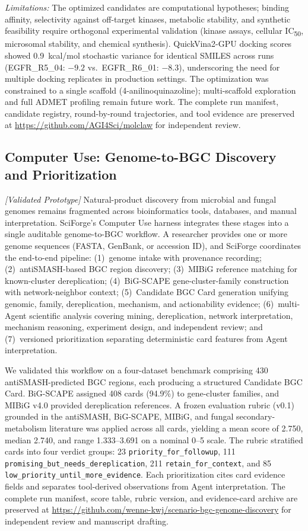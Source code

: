 \documentclass[sn-basic,Numbered,pdflatex]{sn-jnl}
\begin{document}
\textit{Limitations:} The optimized candidates are computational hypotheses; binding affinity, selectivity against off-target kinases, metabolic stability, and synthetic feasibility require orthogonal experimental validation (kinase assays, cellular IC\textsubscript{50}, microsomal stability, and chemical synthesis). QuickVina2-GPU docking scores showed 0.9~kcal/mol stochastic variance for identical SMILES across runs (EGFR\_R5\_04: $-9.2$ vs.\ EGFR\_R6\_01: $-8.3$), underscoring the need for multiple docking replicates in production settings. The optimization was constrained to a single scaffold (4-anilinoquinazoline); multi-scaffold exploration and full ADMET profiling remain future work. The complete run manifest, candidate registry, round-by-round trajectories, and tool evidence are preserved at \url{https://github.com/AGI4Sci/molclaw} for independent review.

\FloatBarrier
\subsection{Computer Use: Genome-to-BGC Discovery and Prioritization}

\textit{[Validated Prototype]} Natural-product discovery from microbial and fungal genomes remains fragmented across bioinformatics tools, databases, and manual interpretation. SciForge's Computer Use harness integrates these stages into a single auditable genome-to-BGC workflow. A researcher provides one or more genome sequences (FASTA, GenBank, or accession ID), and SciForge coordinates the end-to-end pipeline: (1)~genome intake with provenance recording; (2)~antiSMASH-based BGC region discovery; (3)~MIBiG reference matching for known-cluster dereplication; (4)~BiG-SCAPE gene-cluster-family construction with network-neighbor context; (5)~Candidate BGC Card generation unifying genomic, family, dereplication, mechanism, and actionability evidence; (6)~multi-Agent scientific analysis covering mining, dereplication, network interpretation, mechanism reasoning, experiment design, and independent review; and (7)~versioned prioritization separating deterministic card features from Agent interpretation.

We validated this workflow on a four-dataset benchmark comprising 430 antiSMASH-predicted BGC regions, each producing a structured Candidate BGC Card. BiG-SCAPE assigned 408 cards (94.9\%) to gene-cluster families, and MIBiG v4.0 provided dereplication references. A frozen evaluation rubric (v0.1) grounded in the antiSMASH, BiG-SCAPE, MIBiG, and fungal secondary-metabolism literature was applied across all cards, yielding a mean score of 2.750, median 2.740, and range 1.333--3.691 on a nominal 0--5 scale. The rubric stratified cards into four verdict groups: 23 \texttt{priority\_for\_followup}, 111 \texttt{promising\_but\_needs\_dereplication}, 211 \texttt{retain\_for\_context}, and 85 \texttt{low\_priority\_until\_more\_evidence}. Each prioritization cites card evidence fields and separates tool-derived observations from Agent interpretation. The complete run manifest, score table, rubric version, and evidence-card archive are preserved at \url{https://github.com/wenne-kwj/scenario-bgc-genome-discovery} for independent review and manuscript drafting.
\end{document}
